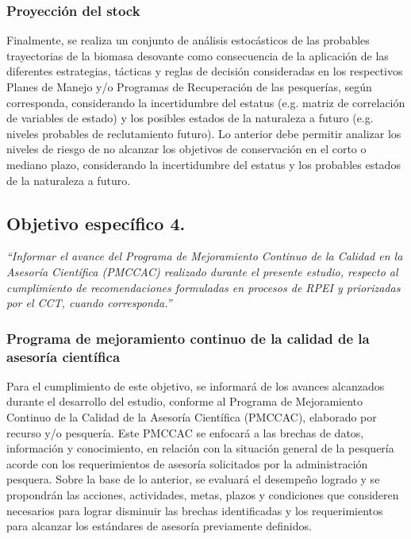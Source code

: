 \documentclass[letter,11pt]{article}
\begin{document}
\subsubsection{Proyecci\'on del stock}

Finalmente, se realiza un conjunto de an\'alisis estoc\'asticos de las
probables trayectorias de la biomasa desovante como consecuencia de la
aplicaci\'on de las diferentes estrategias, t\'acticas y reglas de decisi\'on
consideradas en los respectivos Planes de Manejo y/o Programas de
Recuperaci\'on de las pesquer\'ias, seg\'un corresponda, considerando la
incertidumbre del estatus (e.g. matriz de correlaci\'on de variables de
estado) y los posibles estados de la naturaleza a futuro (e.g. niveles
probables de reclutamiento futuro). Lo anterior debe permitir analizar
los niveles de riesgo de no alcanzar los objetivos de conservaci\'on en el
corto o mediano plazo, considerando la incertidumbre del estatus y los
probables estados de la naturaleza a futuro.\\


\clearpage
\newpage

\subsection{Objetivo espec\'ifico 4.}

\textit{\textquotedblleft Informar el avance del Programa de Mejoramiento Continuo de la Calidad en la Asesor\'ia Cient\'ifica (PMCCAC) realizado durante el presente estudio, respecto al cumplimiento de recomendaciones formuladas en procesos de RPEI y priorizadas por el CCT, cuando corresponda.\textquotedblright}
\vspace{-0.2cm}

\subsubsection{Programa de mejoramiento continuo de la calidad de la asesor\'ia cient\'ifica}

Para el cumplimiento de este objetivo, se informar\'a de los avances
alcanzados durante el desarrollo del estudio, conforme al Programa de
Mejoramiento Continuo de la Calidad de la Asesor\'ia Cient\'ifica (PMCCAC),
elaborado por recurso y/o pesquer\'ia. Este PMCCAC se enfocar\'a a las
brechas de datos, informaci\'on y conocimiento, en relaci\'on con la
situaci\'on general de la pesquer\'ia acorde con los requerimientos de
asesor\'ia solicitados por la administraci\'on pesquera. Sobre la base de lo
anterior, se evaluar\'a el desempe\~{n}o logrado y se propondr\'an las acciones,
actividades, metas, plazos y condiciones que consideren necesarios para
lograr disminuir las brechas identificadas y los requerimientos para
alcanzar los est\'andares de asesor\'ia previamente definidos.
\end{document}
